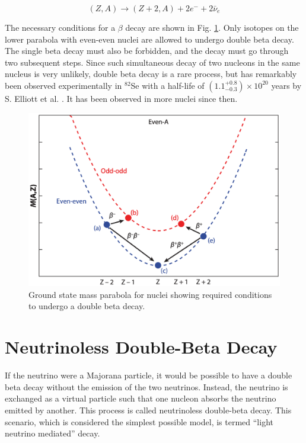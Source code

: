 \begin{equation}\label{beta_decay_eq}
(Z,A) \rightarrow (Z+2,A) + 2e^- + 2\bar{\nu}_e
\end{equation}

The necessary conditions for a $\beta$ decay are shown in Fig. \ref{2nbb_cond}. Only isotopes on the lower parabola with even-even nuclei are allowed to undergo double beta decay. The single beta decay must also be forbidden, and the decay must go through two subsequent steps. Since such simultaneous decay of two nucleons in the same nucleus is very unlikely, double beta decay is a rare process, but has remarkably been observed experimentally in $^{82}$Se with a half-life of $(1.1^{+0.8}_{-0.3})\times 10^{20}$ years by S. Elliott et al. \cite{PhysRevLett.59.2020}. It has been observed in more nuclei since then.

\begin{figure}
\centering
\includegraphics[width=0.6\linewidth]{ch1/figs/2nbb_cond.png}
\caption{Ground state mass parabola for nuclei showing required conditions to undergo a double beta decay. \cite{2nbb_cond}}
\label{2nbb_cond}
\end{figure}

\section{Neutrinoless Double-Beta Decay}
If the neutrino were a Majorana particle, it would be possible to have a double beta decay without the emission of the two neutrinos. Instead, the neutrino is exchanged as a virtual particle such that one nucleon absorbs the neutrino emitted by another. This process is called neutrinoless double-beta decay. This scenario, which is considered the simplest possible model, is termed ``light neutrino mediated'' decay.



